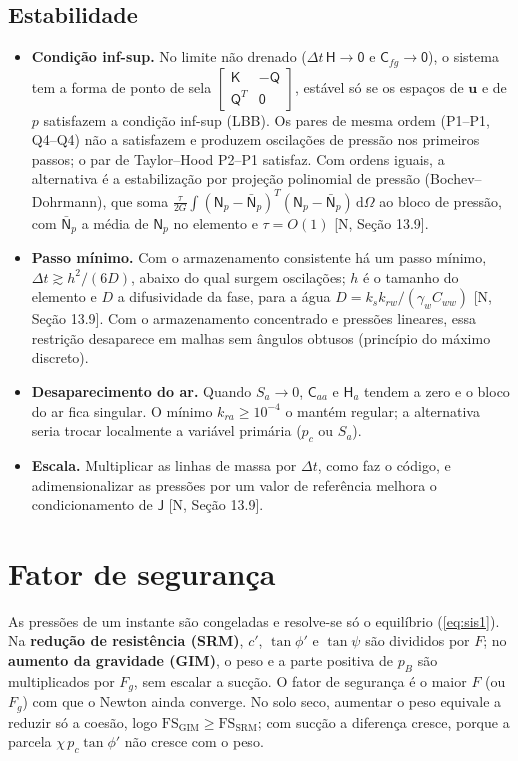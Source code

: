 \documentclass[11pt,a4paper]{article}
\newcommand{\vu}{\bm u}
\newcommand{\mt}[1]{\mathsf{#1}}
\newcommand{\dd}{\mathrm d}
\begin{document}
\subsection{Estabilidade}
\label{sec:estabilidade}
\begin{itemize}[leftmargin=*]
\item \textbf{Condição inf-sup.} No limite não drenado ($\Delta t\,\mt H\to\mt 0$ e
  $\mt C_{fg}\to\mt 0$), o sistema tem a forma de ponto de sela
  $\left[\begin{smallmatrix}\mt K&-\mt Q\\\mt Q^T&\mt 0\end{smallmatrix}\right]$, estável só
  se os espaços de $\vu$ e de $p$ satisfazem a condição inf-sup (LBB). Os pares de mesma
  ordem (P1--P1, Q4--Q4) não a satisfazem e produzem oscilações de pressão nos primeiros
  passos; o par de Taylor--Hood P2--P1 satisfaz. Com ordens iguais, a alternativa é a
  estabilização por projeção polinomial de pressão (Bochev--Dohrmann), que soma
  $\frac{\tau}{2G}\int(\mt N_p-\bar{\mt N}_p)^T(\mt N_p-\bar{\mt N}_p)\,\dd\Omega$ ao bloco
  de pressão, com $\bar{\mt N}_p$ a média de $\mt N_p$ no elemento e $\tau=O(1)$
  [N, Seção 13.9].
\item \textbf{Passo mínimo.} Com o armazenamento consistente há um passo mínimo,
  $\Delta t\gtrsim h^2/(6D)$, abaixo do qual surgem oscilações; $h$ é o tamanho do elemento e
  $D$ a difusividade da fase, para a água $D=k_sk_{rw}/(\gamma_wC_{ww})$ [N, Seção 13.9].
  Com o armazenamento concentrado e pressões lineares, essa restrição desaparece em malhas
  sem ângulos obtusos (princípio do máximo discreto).
\item \textbf{Desaparecimento do ar.} Quando $S_a\to0$, $\mt C_{aa}$ e $\mt H_a$ tendem a zero
  e o bloco do ar fica singular. O mínimo $k_{ra}\ge10^{-4}$ o mantém regular; a alternativa
  seria trocar localmente a variável primária ($p_c$ ou $S_a$).
\item \textbf{Escala.} Multiplicar as linhas de massa por $\Delta t$, como faz o código, e
  adimensionalizar as pressões por um valor de referência melhora o condicionamento de
  $\mt J$ [N, Seção 13.9].
\end{itemize}

\section{Fator de segurança}
As pressões de um instante são congeladas e resolve-se só o equilíbrio (\ref{eq:sis1}).
Na \textbf{redução de resistência (SRM)}, $c'$, $\tan\phi'$ e $\tan\psi$ são divididos por
$F$; no \textbf{aumento da gravidade (GIM)}, o peso e a parte positiva de $p_B$ são
multiplicados por $F_g$, sem escalar a sucção. O fator de segurança é o maior $F$ (ou
$F_g$) com que o Newton ainda converge. No solo seco, aumentar o peso equivale a reduzir
só a coesão, logo $\mathrm{FS}_{\mathrm{GIM}}\ge\mathrm{FS}_{\mathrm{SRM}}$; com sucção a
diferença cresce, porque a parcela $\chi\,p_c\tan\phi'$ não cresce com o peso.
\end{document}
